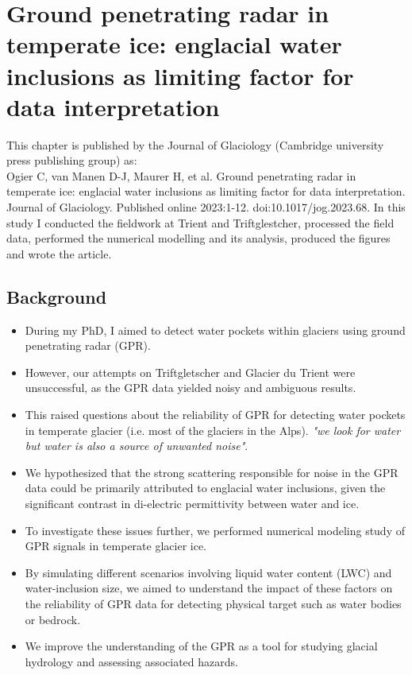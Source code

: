 \chapter[GPR in temperate ice: englacial water inclusions as limiting factor for data interpretation]{Ground penetrating radar in temperate ice: englacial water inclusions as limiting factor for data interpretation}
\label{ch:chapter_gprmax}


This chapter is published by the Journal of Glaciology (Cambridge university press publishing
group) as:\\
Ogier C, van Manen D-J, Maurer H, et al. Ground penetrating radar in temperate ice: englacial water inclusions as limiting factor for data interpretation. Journal of Glaciology. Published online 2023:1-12. doi:10.1017/jog.2023.68. In this study I conducted the fieldwork at Trient and Triftglestcher, processed the field data, performed the numerical modelling and its analysis, produced the figures and wrote the article. 

\section{Background} 

\begin{itemize}
    \item During my PhD, I aimed to detect water pockets within glaciers using ground penetrating radar (GPR).
  
    \item However, our attempts on Triftgletscher and Glacier du Trient were unsuccessful, as the GPR data yielded noisy and ambiguous results.
  
    \item This raised questions about the reliability of GPR for detecting water pockets in temperate glacier (i.e. most of the glaciers in the Alps). \textit{"we look for water but water is also a source of unwanted noise"}.
  
    \item We hypothesized that the strong scattering responsible for noise in the GPR data could be primarily attributed to englacial water inclusions, given the significant contrast in di-electric permittivity between water and ice. 
  
    \item To investigate these issues further, we performed numerical modeling study of GPR signals in temperate glacier ice.
  
    \item By simulating different scenarios involving liquid water content (LWC) and water-inclusion size, we aimed to understand the impact of these factors on the reliability of GPR data for detecting physical target such as water bodies or bedrock.
  
    \item We improve the understanding of the GPR as a tool for studying glacial hydrology and assessing associated hazards.
    
\end{itemize}


